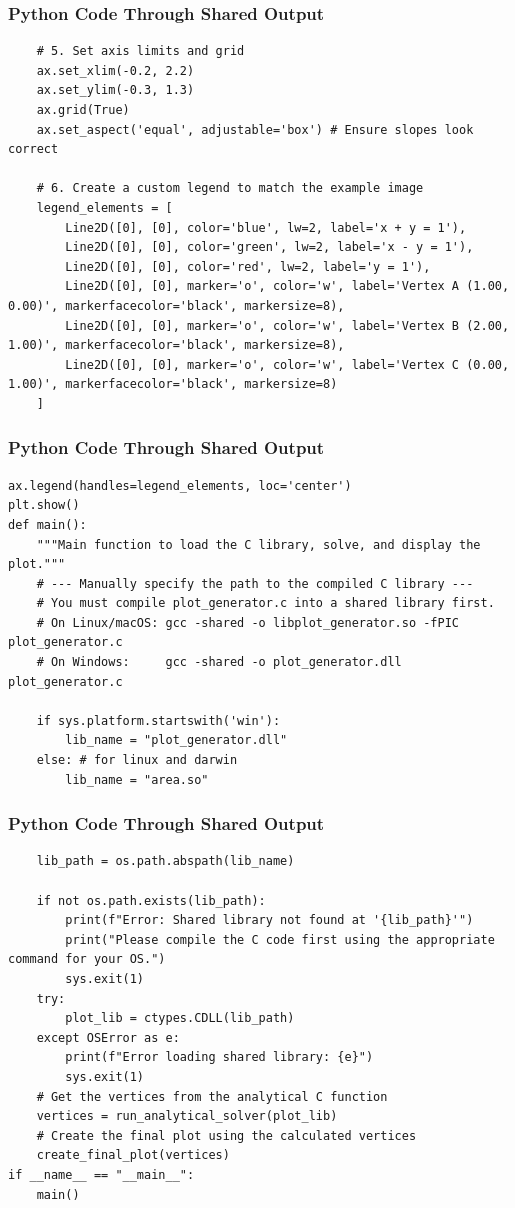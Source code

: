 \documentclass{beamer}
\begin{document}
\begin{frame}[fragile]
\frametitle{Python Code Through Shared Output }
\begin{lstlisting}
    # 5. Set axis limits and grid
    ax.set_xlim(-0.2, 2.2)
    ax.set_ylim(-0.3, 1.3)
    ax.grid(True)
    ax.set_aspect('equal', adjustable='box') # Ensure slopes look correct

    # 6. Create a custom legend to match the example image
    legend_elements = [
        Line2D([0], [0], color='blue', lw=2, label='x + y = 1'),
        Line2D([0], [0], color='green', lw=2, label='x - y = 1'),
        Line2D([0], [0], color='red', lw=2, label='y = 1'),
        Line2D([0], [0], marker='o', color='w', label='Vertex A (1.00, 0.00)', markerfacecolor='black', markersize=8),
        Line2D([0], [0], marker='o', color='w', label='Vertex B (2.00, 1.00)', markerfacecolor='black', markersize=8),
        Line2D([0], [0], marker='o', color='w', label='Vertex C (0.00, 1.00)', markerfacecolor='black', markersize=8)
    ]
\end{lstlisting}    
\end{frame}
\begin{frame}[fragile]
\frametitle{Python Code Through Shared Output }
\begin{lstlisting}
ax.legend(handles=legend_elements, loc='center')
plt.show()
def main():
    """Main function to load the C library, solve, and display the plot."""
    # --- Manually specify the path to the compiled C library ---
    # You must compile plot_generator.c into a shared library first.
    # On Linux/macOS: gcc -shared -o libplot_generator.so -fPIC plot_generator.c
    # On Windows:     gcc -shared -o plot_generator.dll plot_generator.c
    
    if sys.platform.startswith('win'):
        lib_name = "plot_generator.dll"
    else: # for linux and darwin
        lib_name = "area.so"
  \end{lstlisting}    
\end{frame}
\begin{frame}[fragile]
\frametitle{Python Code Through Shared Output }
\begin{lstlisting}      
    lib_path = os.path.abspath(lib_name)

    if not os.path.exists(lib_path):
        print(f"Error: Shared library not found at '{lib_path}'")
        print("Please compile the C code first using the appropriate command for your OS.")
        sys.exit(1)
    try:
        plot_lib = ctypes.CDLL(lib_path)
    except OSError as e:
        print(f"Error loading shared library: {e}")
        sys.exit(1)
    # Get the vertices from the analytical C function
    vertices = run_analytical_solver(plot_lib)
    # Create the final plot using the calculated vertices
    create_final_plot(vertices)
if __name__ == "__main__":
    main()
\end{lstlisting}    
\end{frame}
\end{document}
